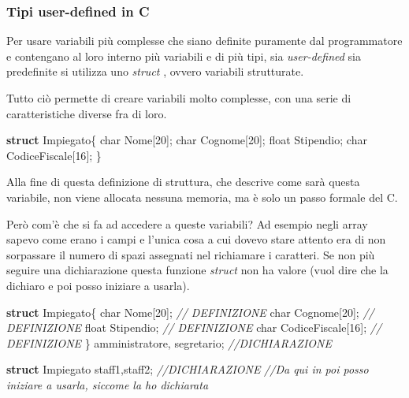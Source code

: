 \documentclass[
]{article}
\newenvironment{Shaded}{}{}
\newcommand{\CommentTok}[1]{\textcolor[rgb]{0.38,0.63,0.69}{\textit{#1}}}
\newcommand{\DataTypeTok}[1]{\textcolor[rgb]{0.56,0.13,0.00}{#1}}
\newcommand{\DecValTok}[1]{\textcolor[rgb]{0.25,0.63,0.44}{#1}}
\newcommand{\KeywordTok}[1]{\textcolor[rgb]{0.00,0.44,0.13}{\textbf{#1}}}
\newcommand{\NormalTok}[1]{#1}
\begin{document}
\hypertarget{header-n604}{%
\subsubsection{Tipi user-defined in C}\label{header-n604}}

Per usare variabili più complesse che siano definite puramente dal
programmatore e contengano al loro interno più variabili e di più tipi,
sia \emph{user-defined} sia predefinite si utilizza uno \emph{struct} ,
ovvero variabili strutturate.

Tutto ciò permette di creare variabili molto complesse, con una serie di
caratteristiche diverse fra di loro.

\begin{Shaded}
\begin{Highlighting}[]
\KeywordTok{struct}\NormalTok{ Impiegato\{}
	\DataTypeTok{char}\NormalTok{ Nome[}\DecValTok{20}\NormalTok{];}
    \DataTypeTok{char}\NormalTok{ Cognome[}\DecValTok{20}\NormalTok{];}
    \DataTypeTok{float}\NormalTok{ Stipendio;}
    \DataTypeTok{char}\NormalTok{ CodiceFiscale[}\DecValTok{16}\NormalTok{];}
\NormalTok{\}}
\end{Highlighting}
\end{Shaded}

Alla fine di questa definizione di struttura, che descrive come sarà
questa variabile, non viene allocata nessuna memoria, ma è solo un passo
formale del C.

Però com'è che si fa ad accedere a queste variabili? Ad esempio negli
array sapevo come erano i campi e l'unica cosa a cui dovevo stare
attento era di non sorpassare il numero di spazi assegnati nel
richiamare i caratteri. Se non più seguire una dichiarazione questa
funzione \emph{struct} non ha valore (vuol dire che la dichiaro e poi
posso iniziare a usarla).

\begin{Shaded}
\begin{Highlighting}[]
\KeywordTok{struct}\NormalTok{ Impiegato\{}
	\DataTypeTok{char}\NormalTok{ Nome[}\DecValTok{20}\NormalTok{];				}\CommentTok{// DEFINIZIONE}
    \DataTypeTok{char}\NormalTok{ Cognome[}\DecValTok{20}\NormalTok{];			}\CommentTok{// DEFINIZIONE}
    \DataTypeTok{float}\NormalTok{ Stipendio;			}\CommentTok{// DEFINIZIONE}
    \DataTypeTok{char}\NormalTok{ CodiceFiscale[}\DecValTok{16}\NormalTok{];		}\CommentTok{// DEFINIZIONE}
\NormalTok{\} amministratore, segretario; 	}\CommentTok{//DICHIARAZIONE}

\KeywordTok{struct}\NormalTok{ Impiegato staff1,staff2; }\CommentTok{//DICHIARAZIONE }
\CommentTok{//Da qui in poi posso iniziare a usarla, siccome la ho dichiarata}
\end{Highlighting}
\end{Shaded}
\end{document}
